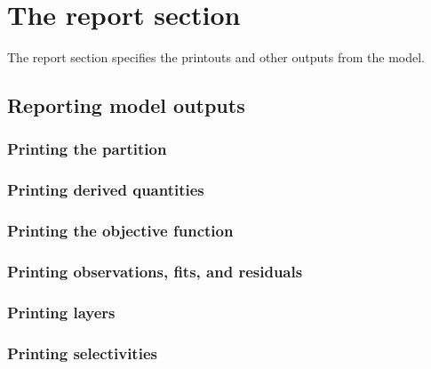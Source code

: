 \section{The report section\label{sec:report-section}}

The report section specifies the printouts and other outputs from the model. 

\subsection{Reporting model outputs}

\subsubsection{Printing the partition}

\subsubsection{Printing derived quantities}

\subsubsection{Printing the objective function}

\subsubsection{Printing observations, fits, and residuals}

\subsubsection{Printing layers}

\subsubsection{Printing selectivities}
